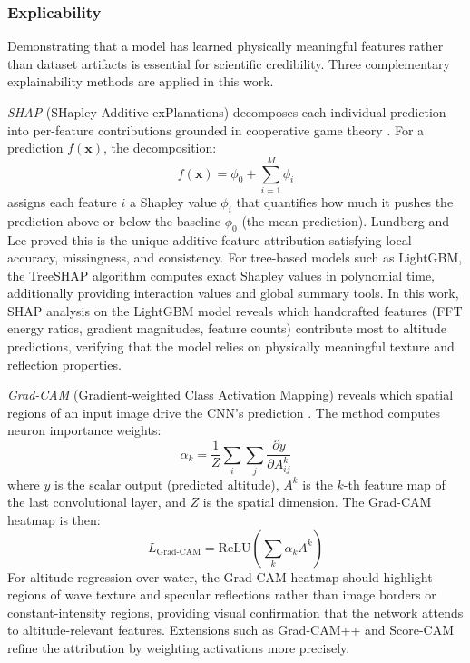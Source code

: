     \subsubsection{Explicability}

    Demonstrating that a model has learned physically meaningful features rather than dataset artifacts is essential for scientific credibility. Three complementary explainability methods are applied in this work.

    \emph{SHAP} (SHapley Additive exPlanations) decomposes each individual prediction into per-feature contributions grounded in cooperative game theory \cite{Lundberg2017}. For a prediction $f(\mathbf{x})$, the decomposition:
    \begin{equation}
        f(\mathbf{x}) = \phi_0 + \sum_{i=1}^{M} \phi_i
        \label{eq:shap}
    \end{equation}
    assigns each feature $i$ a Shapley value $\phi_i$ that quantifies how much it pushes the prediction above or below the baseline $\phi_0$ (the mean prediction). Lundberg and Lee \cite{Lundberg2017} proved this is the unique additive feature attribution satisfying local accuracy, missingness, and consistency. For tree-based models such as LightGBM, the TreeSHAP algorithm \cite{Lundberg2020} computes exact Shapley values in polynomial time, additionally providing interaction values and global summary tools. In this work, SHAP analysis on the LightGBM model reveals which handcrafted features (FFT energy ratios, gradient magnitudes, feature counts) contribute most to altitude predictions, verifying that the model relies on physically meaningful texture and reflection properties.

    \emph{Grad-CAM} (Gradient-weighted Class Activation Mapping) reveals which spatial regions of an input image drive the CNN's prediction \cite{GradCAM2017, GradCAM2020}. The method computes neuron importance weights:
    \begin{equation}
        \alpha_k = \frac{1}{Z} \sum_{i} \sum_{j} \frac{\partial y}{\partial A_{ij}^k}
        \label{eq:gradcam_weights}
    \end{equation}
    where $y$ is the scalar output (predicted altitude), $A^k$ is the $k$-th feature map of the last convolutional layer, and $Z$ is the spatial dimension. The Grad-CAM heatmap is then:
    \begin{equation}
        L_{\mathrm{Grad\text{-}CAM}} = \mathrm{ReLU}\left(\sum_k \alpha_k A^k\right)
        \label{eq:gradcam_heatmap}
    \end{equation}
    For altitude regression over water, the Grad-CAM heatmap should highlight regions of wave texture and specular reflections rather than image borders or constant-intensity regions, providing visual confirmation that the network attends to altitude-relevant features. Extensions such as Grad-CAM++ \cite{GradCAMPP2018} and Score-CAM \cite{ScoreCAM2020} refine the attribution by weighting activations more precisely.


